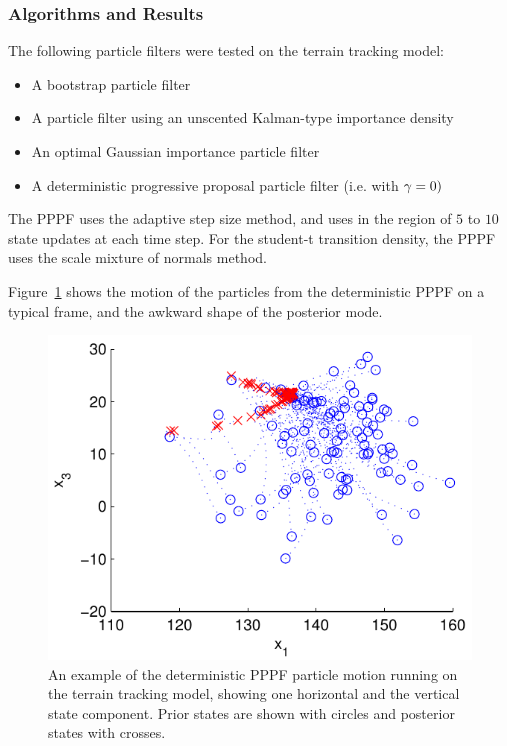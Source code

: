 \documentclass{article}
\begin{document}
\subsubsection{Algorithms and Results}

The following particle filters were tested on the terrain tracking model:
\begin{itemize}
  \item A bootstrap particle filter
  \item A particle filter using an unscented Kalman-type importance density
  \item An optimal Gaussian importance particle filter
  \item A deterministic progressive proposal particle filter (i.e. with $\gamma=0)$
\end{itemize}

The PPPF uses the adaptive step size method, and uses in the region of $5$ to $10$ state updates at each time step. For the student-t transition density, the PPPF uses the scale mixture of normals method.

Figure~\ref{fig:drone_example_frame_deterministic} shows the motion of the particles from the deterministic PPPF on a typical frame, and the awkward shape of the posterior mode.
%
\begin{figure}
\centering
\includegraphics[width=0.7\columnwidth]{drone_example_frame_deter.pdf}
\caption{An example of the deterministic PPPF particle motion running on the terrain tracking model, showing one horizontal and the vertical state component. Prior states are shown with circles and posterior states with crosses.}
\label{fig:drone_example_frame_deterministic}
\end{figure}
\end{document}
